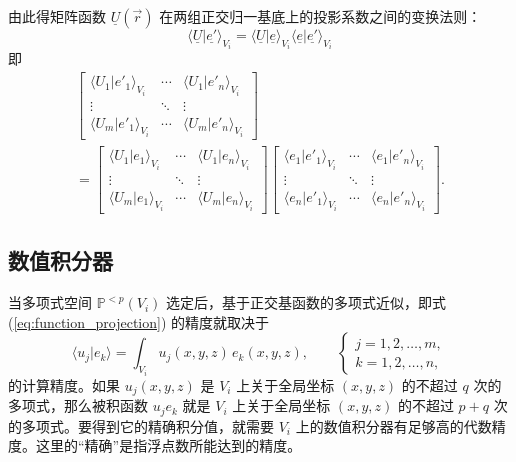 由此得矩阵函数 $\underline{U}(\vec{r})$ 在两组正交归一基底上的投影系数之间的变换法则：
\begin{equation}
\langle\underline{U}\vert\underline{e'}\rangle_{V_{i}}=\langle\underline{U}\vert\underline{e}\rangle_{V_{i}}\langle\underline{e}\vert\underline{e'}\rangle_{V_{i}}
\end{equation}
即
\begin{equation}
\begin{gathered}\begin{bmatrix}\langle U_{1}\vert e'_{1}\rangle_{V_{i}} & \cdots & \langle U_{1}\vert e'_{n}\rangle_{V_{i}}\\
\vdots & \ddots & \vdots\\
\langle U_{m}\vert e'_{1}\rangle_{V_{i}} & \cdots & \langle U_{m}\vert e'_{n}\rangle_{V_{i}}
\end{bmatrix}\\
=\begin{bmatrix}\langle U_{1}\vert e_{1}\rangle_{V_{i}} & \cdots & \langle U_{1}\vert e_{n}\rangle_{V_{i}}\\
\vdots & \ddots & \vdots\\
\langle U_{m}\vert e_{1}\rangle_{V_{i}} & \cdots & \langle U_{m}\vert e_{n}\rangle_{V_{i}}
\end{bmatrix}\begin{bmatrix}\langle e_{1}\vert e'_{1}\rangle_{V_{i}} & \cdots & \langle e_{1}\vert e'_{n}\rangle_{V_{i}}\\
\vdots & \ddots & \vdots\\
\langle e_{n}\vert e'_{1}\rangle_{V_{i}} & \cdots & \langle e_{n}\vert e'_{n}\rangle_{V_{i}}
\end{bmatrix}.
\end{gathered}
\end{equation}


\subsection{数值积分器\label{subsec:quadrature}}

当多项式空间 $\mathbb{P}^{<p}(V_{i})$ 选定后，基于正交基函数的多项式近似，即式 (\ref{eq:function_projection})
的精度就取决于
\begin{equation}
\langle u_{j}\vert e_{k}\rangle=\int_{V_{i}}u_{j}(x,y,z)\,e_{k}(x,y,z),\qquad\begin{cases}
j=1,2,\dots,m,\\
k=1,2,\dots,n,
\end{cases}
\end{equation}
的计算精度。如果 $u_{j}(x,y,z)$ 是 $V_{i}$ 上关于全局坐标 $(x,y,z)$ 的不超过 $q$ 次的多项式，那么被积函数
$u_{j}e_{k}$ 就是 $V_{i}$ 上关于全局坐标 $(x,y,z)$ 的不超过 $p+q$ 次的多项式。要得到它的精确积分值，就需要
$V_{i}$ 上的数值积分器有足够高的代数精度。这里的“精确”是指浮点数所能达到的精度。


